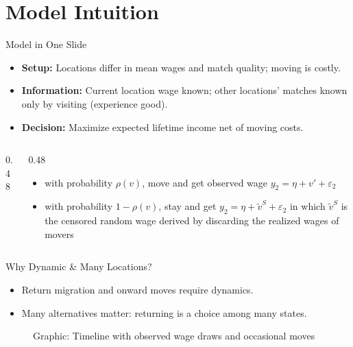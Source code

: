 \documentclass[aspectratio=169,professionalfonts]{beamer}
\newcommand{\hl}[1]{\textbf{\textcolor{UGARed}{#1}}}
\newcommand{\figph}[2][0.9\linewidth]{%
  \begin{figure}
    \centering
    \fbox{\rule{0pt}{0.55#1}\rule{#1}{0pt}}%
    \caption{#2}
  \end{figure}
}
\newcommand{\hl}[1]{\textbf{\color{UGARed}{#1}}}
\newcommand{\figph}[1]{\begin{center}\fbox{\parbox{0.85\linewidth}{\centering \vspace{0.6em} \textit{#1} \vspace{0.6em}}}\end{center}}
\begin{document}
\section{Model Intuition}

\begin{frame}{Model in One Slide}
  \begin{itemize}
    \item \hl{Setup:} Locations differ in mean wages and match quality; moving is costly.
    \item \hl{Information:} Current location wage known; other locations' matches known only by visiting (experience good).
    \item \hl{Decision:} Maximize expected lifetime income net of moving costs.
  \end{itemize}
  \begin{columns}[T,onlytextwidth]
    \begin{column}{0.48\linewidth}
    \end{column}
    \begin{column}{0.48\linewidth}
      \begin{itemize}
        \item with probability $\rho(v)$, move and get observed wage $y_2 = \eta + v' + \varepsilon_2$
        \item with probability $1-\rho(v)$, stay and get $y_2 = \eta + \tilde{v}^S + \varepsilon_2$ in which $\tilde{v}^S$ is the censored random wage derived by discarding the realized wages of movers
      \end{itemize}
    \end{column}
  \end{columns}
\end{frame}

\begin{frame}{Why Dynamic \& Many Locations?}
  \begin{itemize}
    \item Return migration and onward moves require dynamics.
    \item Many alternatives matter: returning is a choice among many states.
  \end{itemize}
  \figph{Graphic: Timeline with observed wage draws and occasional moves}
\end{frame}
\end{document}
